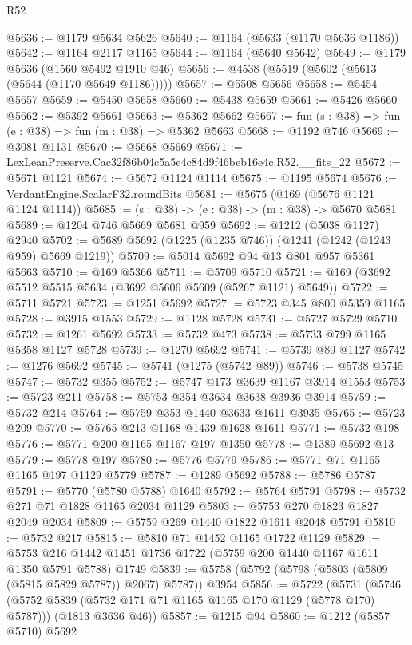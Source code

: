 \begin{lexlean}{R52}
\begin{coremodule}
@5636 := @1179 @5634 @5626
@5640 := @1164 (@5633 (@1170 @5636 @1186))
@5642 := @1164 @2117 @1165
@5644 := @1164 (@5640 @5642)
@5649 := @1179 @5636 (@1560 @5492 @1910 @46)
@5656 := @4538 (@5519 (@5602 (@5613 (@5644 (@1170 @5649 @1186)))))
@5657 := @5508 @5656
@5658 := @5454 @5657
@5659 := @5450 @5658
@5660 := @5438 @5659
@5661 := @5426 @5660
@5662 := @5392 @5661
@5663 := @5362 @5662
@5667 := fun (s : @38) => fun (e : @38) => fun (m : @38) => @5362 @5663
@5668 := @1192 @746
@5669 := @3081 @1131
@5670 := @5668 @5669
@5671 := LexLeanPreserve.Cac32f86b04c5a5e4c84d9f46beb16e4c.R52.__fits_22
@5672 := @5671 @1121
@5674 := @5672 @1124 @1114
@5675 := @1195 @5674
@5676 := VerdantEngine.ScalarF32.roundBits
@5681 := @5675 (@169 (@5676 @1121 @1124 @1114))
@5685 := (s : @38) -> (e : @38) -> (m : @38) -> @5670 @5681
@5689 := @1204 @746 @5669 @5681 @959
@5692 := @1212 (@5038 @1127) @2940
@5702 := @5689 @5692 (@1225 (@1235 @746)) (@1241 (@1242 (@1243 @959) @5669 @1219))
@5709 := @5014 @5692 @94 @13 @801 @957 @5361 @5663
@5710 := @169 @5366
@5711 := @5709 @5710
@5721 := @169 (@3692 @5512 @5515 @5634 (@3692 @5606 @5609 (@5267 @1121) @5649))
@5722 := @5711 @5721
@5723 := @1251 @5692
@5727 := @5723 @345 @800 @5359 @1165
@5728 := @3915 @1553
@5729 := @1128 @5728
@5731 := @5727 @5729 @5710
@5732 := @1261 @5692
@5733 := @5732 @473
@5738 := @5733 @799 @1165 @5358 @1127 @5728
@5739 := @1270 @5692
@5741 := @5739 @89 @1127
@5742 := @1276 @5692
@5745 := @5741 (@1275 (@5742 @89))
@5746 := @5738 @5745
@5747 := @5732 @355
@5752 := @5747 @173 @3639 @1167 @3914 @1553
@5753 := @5723 @211
@5758 := @5753 @354 @3634 @3638 @3936 @3914
@5759 := @5732 @214
@5764 := @5759 @353 @1440 @3633 @1611 @3935
@5765 := @5723 @209
@5770 := @5765 @213 @1168 @1439 @1628 @1611
@5771 := @5732 @198
@5776 := @5771 @200 @1165 @1167 @197 @1350
@5778 := @1389 @5692 @13
@5779 := @5778 @197
@5780 := @5776 @5779
@5786 := @5771 @71 @1165 @1165 @197 @1129 @5779
@5787 := @1289 @5692
@5788 := @5786 @5787
@5791 := @5770 (@5780 @5788) @1640
@5792 := @5764 @5791
@5798 := @5732 @271 @71 @1828 @1165 @2034 @1129
@5803 := @5753 @270 @1823 @1827 @2049 @2034
@5809 := @5759 @269 @1440 @1822 @1611 @2048 @5791
@5810 := @5732 @217
@5815 := @5810 @71 @1452 @1165 @1722 @1129
@5829 := @5753 @216 @1442 @1451 @1736 @1722 (@5759 @200 @1440 @1167 @1611 @1350 @5791 @5788) @1749
@5839 := @5758 (@5792 (@5798 (@5803 (@5809 (@5815 @5829 @5787)) @2067) @5787)) @3954
@5856 := @5722
    (@5731
      (@5746 (@5752 @5839 (@5732 @171 @71 @1165 @1165 @170 @1129 (@5778 @170) @5787)))
      (@1813 @3636 @46))
@5857 := @1215 @94
@5860 := @1212 (@5857 @5710) @5692

\end{coremodule}
\end{lexlean}

